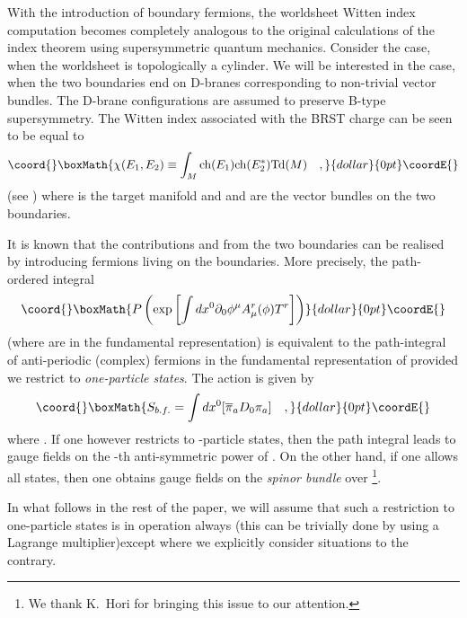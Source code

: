 \documentclass[a4paper,12pt]{article}
\begin{document}
With the introduction of boundary fermions, the worldsheet Witten 
index computation becomes completely analogous to
the original calculations of the index theorem using supersymmetric
quantum mechanics. 
Consider the case, when the worldsheet is topologically a cylinder.
We will be interested in the case, when the two boundaries end on
D-branes corresponding to non-trivial vector bundles. The D-brane
configurations are assumed to preserve B-type supersymmetry. The
Witten index associated with the BRST charge \coordHE{} can be seen to be equal to
$$\coord{}\boxMath{
\chi(E_1,E_2)\equiv \int_M {\rm ch}(E_1) {\rm ch}(E_2^*) {\rm Td} (M)
\quad,}{dollar}{0pt}\coordE{}$$
(see \cite{HIV}) where \coordHE{} is the target manifold and \coordHE{} and \coordHE{}
are the vector bundles on the two boundaries. 

It is known that the contributions \coordHE{} and \coordHE{}
from the two boundaries can be realised by introducing fermions living
on the boundaries. More precisely, the path-ordered integral
$$\coord{}\boxMath{
P\left(\exp\left[\int dx^0 \partial_0 \phi^\mu A_\mu^r(\phi) T^r\right]\right)
}{dollar}{0pt}\coordE{}$$ 
(where \coordHE{} are in the fundamental representation) is equivalent to
the path-integral of anti-periodic (complex) fermions in the fundamental
representation of \coordHE{} provided we restrict to {\em one-particle
states}\cite{luis}.
The action is given by 
$$\coord{}\boxMath{
S_{b.f.}=\int dx^0 [\overline{\pi}_a D_0 \pi_a]\quad,}{dollar}{0pt}\coordE{}$$
where \coordHE{}.
 If one however restricts to \coordHE{}-particle states, then the path integral
leads to gauge fields on the \coordHE{}-th anti-symmetric power of \coordHE{}. On the
other hand, if one allows all states, then one obtains gauge fields on
the {\em spinor bundle} over \coordHE{}\footnote{We thank K.~Hori for bringing
this issue to our attention.}.

In what follows in the rest of the paper, we will assume that such a
restriction to one-particle states is in operation always (this can be
trivially done by using a Lagrange multiplier\cite{dhoker})except
where we explicitly consider situations to the contrary.   
\end{document}
